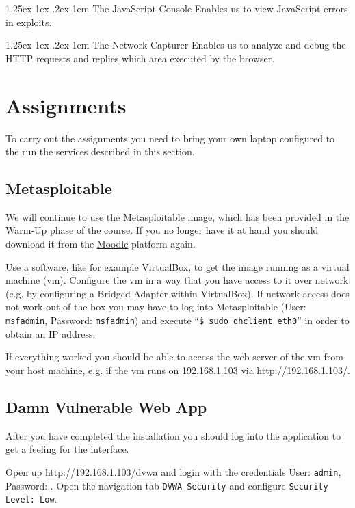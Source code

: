 \documentclass{report}
\makeatletter
\renewcommand{\paragraph}{
  \@startsection{paragraph}{4}
    {\z@}{1.25ex \@plus 1ex \@minus .2ex}{-1em}
      {\normalfont\normalsize\bfseries}
      }
\makeatother
\begin{document}
\paragraph{The JavaScript Console}
Enables us to view JavaScript errors in exploits.

\paragraph{The Network Capturer}
Enables us to analyze and debug the HTTP requests and replies which area
executed by the browser.


\section{Assignments}

To carry out the assignments you need to bring your own laptop configured
to the run the services described in this section.

\subsection{Metasploitable}
We will continue to use the Metasploitable image, which has been provided 
in the Warm-Up phase of the course. If you no longer have it at hand you
should download it from the 
\href{https://moodle.uni-ulm.de/course/view.php?id=1312}{Moodle} platform
again. 

Use a software, like for example VirtualBox, to get the image running
as a virtual machine (vm). Configure the vm in a way that you have
access to it over network (e.g. by configuring a Bridged Adapter within 
VirtualBox). If network access does not work out of the box you may
have to log into Metasploitable (User: \texttt{msfadmin}, Password:
\texttt{msfadmin}) and execute ``\texttt{\$ sudo dhclient eth0}'' in order
to obtain an IP address.

If everything worked you should be able to access the web server of the
vm from your host machine, e.g. if the vm runs on
192.168.1.103 via
\href{http://192.168.1.103/}{http://192.168.1.103/}.

\subsection{Damn Vulnerable Web App}
After you have completed the installation you should log into the
application to get a feeling for the interface.

Open up \href{http://192.168.1.103/dvwa}{http://192.168.1.103/dvwa}
and login with the credentials User: \texttt{admin}, Password: 
.
Open the navigation tab
\texttt{DVWA Security} and configure \texttt{Security Level: Low}.
\end{document}
